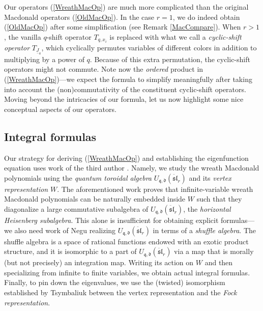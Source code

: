 \documentclass{amsart}
\newcommand{\qqq}{\mathfrak{q}}
\newcommand{\ddd}{\mathfrak{d}}
\newcommand{\Ju}{{\underline{J}}}
\theoremstyle{remark}
\numberwithin{thm}{section}
\numberwithin{equation}{section}
\begin{document}
Our operators (\ref{WreathMacOp}) are much more complicated than the original Macdonald operators (\ref{OldMacOp}).
In the case $r=1$, we do indeed obtain (\ref{OldMacOp}) after some simplification (see Remark \ref{MacCompare}).
When $r>1$, the vanilla $q$-shift operator $T_{q,x_i}$ is replaced with what we call a \textit{cyclic-shift operator} $T_{\Ju_a}$, which cyclically permutes variables of different colors in addition to multiplying by a power of $q$.
Because of this extra permutation, the cyclic-shift operators might not commute.
Note now the \textit{ordered} product in (\ref{WreathMacOp})---we expect the formula to simplify meaningfully after taking into account the (non)commutativity of the constituent cyclic-shift operators.
Moving beyond the intricacies of our formula, let us now highlight some nice conceptual aspects of our operators.

\subsection{Integral formulas}
Our strategy for deriving (\ref{WreathMacOp}) and establishing the eigenfunction equation uses work of the third author \cite{Wen}.
Namely, we study the wreath Macdonald polynomials using the \textit{quantum toroidal algebra} $U_{\qqq,\ddd}(\ddot{\mathfrak{sl}}_r)$ and its \textit{vertex representation} $W$.
The aforementioned work proves that infinite-variable wreath Macdonald polynomials can be naturally embedded inside $W$ such that they diagonalize a large commutative subalgebra of $U_{\qqq,\ddd}(\ddot{\mathfrak{sl}}_r)$, the \textit{horizontal Heisenberg subalgebra}.
This alone is insufficient for obtaining explicit formulas---we also need work of Negu \cite{Neg} realizing $U_{\qqq,\ddd}(\ddot{\mathfrak{sl}}_r)$ in terms of a \textit{shuffle algebra}.
The shuffle algebra is a space of rational functions endowed with an exotic product structure, and it is isomorphic to a part of $U_{\qqq,\ddd}(\ddot{\mathfrak{sl}}_r)$ via a map that is morally (but not precisely) an integration map.
Writing its action on $W$ and then specializing from infinite to finite variables, we obtain actual integral formulas.
Finally, to pin down the eigenvalues, we use the (twisted) isomorphism established by Tsymbaliuk \cite{T} between the vertex representation and the \textit{Fock representation}.
\end{document}

